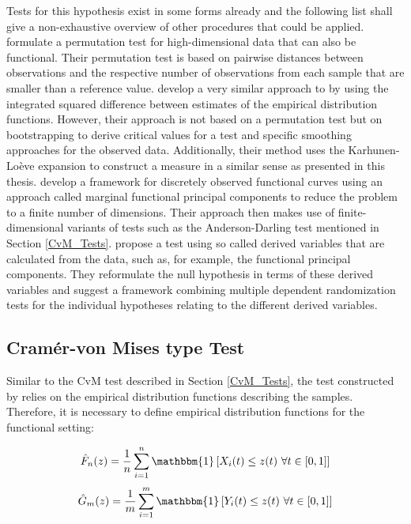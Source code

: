 \documentclass[12pt, a4paper]{article}
\theoremstyle{MAstyle} \newtheorem{assumption}{Assumption}[section]
\theoremstyle{MAstyle} \newtheorem{definition}{Definition}[section]
\theoremstyle{MAstyle} \newtheorem{theorem}{Theorem}[section]
\begin{document}
			Tests for this hypothesis exist in some forms already and the following list shall give a non-exhaustive overview of other procedures that could be applied. \cite{hall_permutation_2002} formulate a permutation test for high-dimensional data that can also be functional. Their permutation test is based on pairwise distances between observations and the respective number of observations from each sample that are smaller than a reference value. 			
			\cite{hall_two-sample_2007} develop a very similar approach to \cite{bugni_permutation_2021}by using the integrated squared difference between estimates of the empirical distribution functions. However, their approach is not based on a permutation test but on bootstrapping to derive critical values for a test and specific smoothing approaches for the observed data. Additionally, their method uses the Karhunen-Lo\`{e}ve expansion to construct a measure in a similar sense as presented in this thesis.
			\cite{pomann_two-sample_2016} develop a framework for discretely observed functional curves using an approach called marginal functional principal components to reduce the problem to a finite number of dimensions. Their approach then makes use of finite-dimensional variants of tests such as the Anderson-Darling test mentioned in Section \ref{CvM_Tests}.
			\cite{corain_new_2014} propose a test using so called derived variables that are calculated from the data, such as, for example, the functional principal components. They reformulate the null hypothesis in terms of these derived variables and suggest a framework combining multiple dependent randomization tests for the individual hypotheses relating to the different derived variables.
		
		\subsection{Cram\'{e}r-von Mises type Test}\label{cvm_type_test}
			Similar to the CvM test described in Section \ref{CvM_Tests}, the test constructed by \cite{bugni_permutation_2021} relies on the empirical distribution functions describing the samples. 
			Therefore, it is necessary to define empirical distribution functions for the functional setting:
			\begin{multicols}{2}
				\noindent
				\begin{equation*}
					\hat{F}_n(z) = \frac{1}{n} \sum_{i = 1}^{n}\mathbbm{1}\left[X_i(t) \leq z(t) \ \forall t \in [0,1]\right]
				\end{equation*}
				\begin{equation}
					\hat{G}_m(z) = \frac{1}{m} \sum_{i = 1}^{m}\mathbbm{1}\left[Y_i(t) \leq z(t) \ \forall t \in [0,1]\right]
				\end{equation}
			\end{multicols}
			
\end{document}
